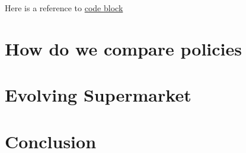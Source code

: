 Here is a reference to \hyperref[code:fifo]{code block}

\chapter{How do we compare policies}

\chapter{Evolving Supermarket}

\chapter{Conclusion}
